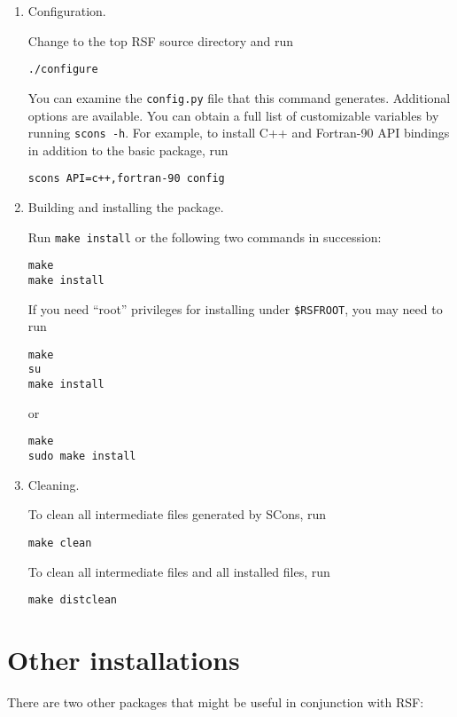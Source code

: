 \begin{enumerate}

\item Configuration.

Change to the top RSF source directory and run
\begin{verbatim}
./configure
\end{verbatim}

You can examine the \texttt{config.py} file that this command
generates.  Additional options are available. You can obtain a full
list of customizable variables by running \texttt{scons -h}. For
example, to install C++ and Fortran-90 API bindings in addition to the
basic package, run
\begin{verbatim}
scons API=c++,fortran-90 config
\end{verbatim}

\item Building and installing the package.

Run \texttt{make install} or the following two commands in succession: 
\begin{verbatim}
make
make install
\end{verbatim}

If you need ``root'' privileges for installing under \texttt{\$RSFROOT}, you may need to run
\begin{verbatim}
make
su
make install
\end{verbatim}
or
\begin{verbatim}
make
sudo make install
\end{verbatim}

\item Cleaning.

To clean all intermediate files generated by SCons, run
\begin{verbatim}
make clean
\end{verbatim}

To clean all intermediate files and all installed files, run
\begin{verbatim}
make distclean
\end{verbatim}

\end{enumerate}

\section{Other installations}

There are two other packages that might be useful in conjunction with RSF:


